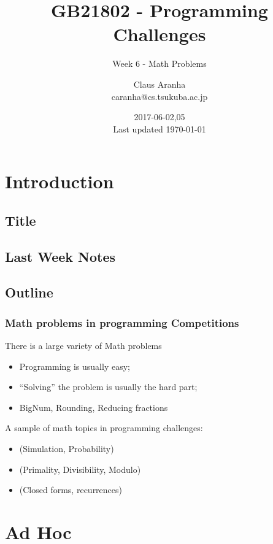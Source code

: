 \documentclass{beamer}
\title[GB21802]{GB21802 - Programming Challenges}
\subtitle[]{Week 6 - Math Problems}
\author[Claus Aranha]{Claus Aranha\\{\footnotesize caranha@cs.tsukuba.ac.jp}}
\institute{College of Information Science}
\date{2017-06-02,05\\{\tiny Last updated \today}}
\begin{document}
\section{Introduction}
\subsection{Title}
\begin{frame}
\maketitle
\end{frame}

\subsection{Last Week Notes}



\subsection{Outline}
\begin{frame}
  \frametitle{Math problems in programming Competitions} {\smaller

    There is a large variety of Math problems
    \begin{itemize}
    \item Programming is usually easy;
    \item ``Solving'' the problem is usually the hard part;
    \item BigNum, Rounding, Reducing fractions
    \end{itemize}
    
    \bigskip

    A sample of math topics in programming challenges:
    \begin{itemize}
    \item {} (Simulation, Probability)
    \item {} (Primality, Divisibility, Modulo)
    \item {} (Closed forms, recurrences)
    \end{itemize}
  }
\end{frame}

\section{Ad Hoc}
\end{document}
